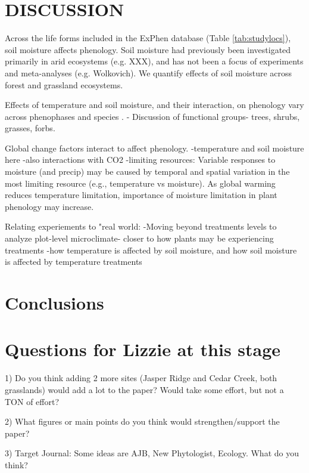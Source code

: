 \documentclass{article}
\begin{document}
\section* {DISCUSSION}
\par  Across the life forms included in the ExPhen database (Table \ref{tab:studylocs}), soil moisture affects phenology. Soil moisture had previously been investigated primarily in arid ecosystems (e.g. XXX), and has not been a focus of experiments and meta-analyses (e.g. Wolkovich). We quantify effects of soil moisture across forest and grassland ecosystems.

\par Effects of temperature and soil moisture, and their interaction, on phenology vary across phenophases and species .
- Discussion of functional groups- trees, shrubs, grasses, forbs.

 \par Global change factors interact to affect phenology.  
 -temperature and soil moisture here
 -also interactions with CO2
 -limiting resources: Variable responses to moisture (and precip) may be caused by temporal and spatial variation in the most limiting resource (e.g., temperature vs moisture). As global warming reduces temperature limitation, importance of moisture limitation in plant phenology may increase. 

\par Relating experiements to "real world:
    -Moving beyond treatments levels to analyze plot-level microclimate- closer to how plants may be experiencing treatments
    -how temperature is affected by soil moisture, and how soil moisture is affected by temperature treatments


\section* {Conclusions}

\section* {Questions for Lizzie at this stage}
1) Do you think adding 2 more sites (Jasper Ridge and Cedar Creek, both grasslands) would add a lot to the paper? Would take some effort, but not a TON of effort?

2) What figures or main points do you think would strengthen/support the paper?

3) Target Journal: Some ideas are AJB, New Phytologist, Ecology. What do you think?
\end{document}
